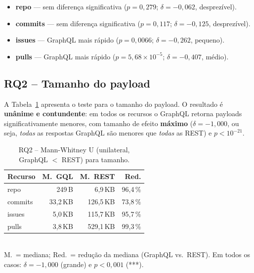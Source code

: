 \documentclass[10pt,a4paper,twocolumn]{article}
\begin{document}
\begin{itemize}
  \item \textbf{repo} --- sem diferença significativa
    ($p=0,279$; $\delta=-0,062$, desprezível).
  \item \textbf{commits} --- sem diferença significativa
    ($p=0,117$; $\delta=-0,125$, desprezível).
  \item \textbf{issues} --- GraphQL mais rápido
    ($p=0,0066$; $\delta=-0,262$, pequeno).
  \item \textbf{pulls} --- GraphQL mais rápido
    ($p=5{,}68\times10^{-5}$; $\delta=-0,407$, médio).
\end{itemize}

\subsection{RQ2 -- Tamanho do payload}

A Tabela~\ref{tab:rq2} apresenta o teste para o tamanho do payload. O
resultado é \textbf{unânime e contundente}: em todos os recursos o GraphQL
retorna payloads significativamente menores, com tamanho de efeito
\textbf{máximo} ($\delta=-1{,}000$, ou seja, \emph{todas} as respostas GraphQL
são menores que \emph{todas} as REST) e $p<10^{-21}$.

\begin{table}[H]
  \centering
  \caption{RQ2 -- Mann-Whitney U (unilateral, GraphQL $<$ REST) para tamanho.}
  \label{tab:rq2}
  \small
  \begin{tabular}{lrrr}
    \toprule
    \textbf{Recurso} & \textbf{M.\ GQL} & \textbf{M.\ REST} & \textbf{Red.} \\
    \midrule
    repo    & 249\,B    & 6,9\,KB   & 96,4\,\% \\
    commits & 33,2\,KB  & 126,5\,KB & 73,8\,\% \\
    issues  & 5,0\,KB   & 115,7\,KB & 95,7\,\% \\
    pulls   & 3,8\,KB   & 529,1\,KB & 99,3\,\% \\
    \bottomrule
  \end{tabular}
  \\[2pt]
  {\scriptsize M.\ = mediana; Red.\ = redução da mediana (GraphQL vs.\ REST).
  Em todos os casos: $\delta=-1,000$ (grande) e $p<0,001$ (***).}
\end{table}
\end{document}
